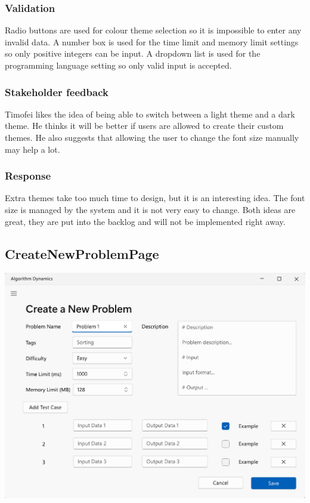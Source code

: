 \documentclass[a4paper]{report}
\begin{document}
\subsubsection{Validation}

Radio buttons are used for colour theme selection so it is impossible to enter any invalid data. A number box is used for the time limit and memory limit settings so only positive integers can be input. A dropdown list is used for the programming language setting so only valid input is accepted.

\subsubsection{Stakeholder feedback}
\label{subsubsec:settingspage stakeholder feedback}

Timofei likes the idea of being able to switch between a light theme and a dark theme. He thinks it will be better if users are allowed to create their custom themes. He also suggests that allowing the user to change the font size manually may help a lot.

\subsubsection{Response}

Extra themes take too much time to design, but it is an interesting idea. The font size is managed by the system and it is not very easy to change. Both ideas are great, they are put into the backlog and will not be implemented right away.

\subsection{CreateNewProblemPage}
\label{sec:CreateNewProblemPageDesign}

\includegraphics[width=\textwidth, height=\textheight, keepaspectratio]{CreateNewProblemPage-design}
\end{document}
